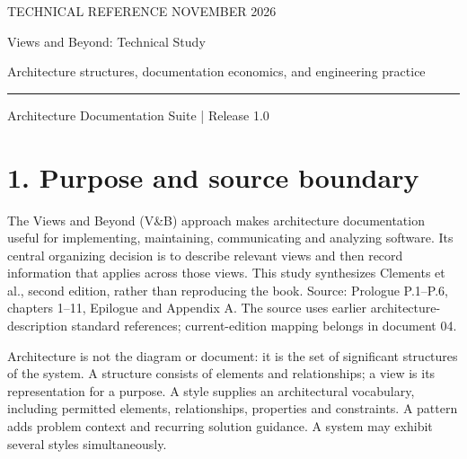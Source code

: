 \documentclass[11pt,letterpaper]{article}
\begin{document}
\thispagestyle{empty}
{\color{accent}\large TECHNICAL REFERENCE \hfill NOVEMBER 2026}\par\vspace{1.1cm}
{\color{ink}\LARGE\bfseries\raggedright Views and Beyond: Technical Study}\par\vspace{0.35cm}
{\Large Architecture structures, documentation economics, and engineering practice}\par\vspace{0.55cm}
\rule{\textwidth}{0.7pt}\par\smallskip
{\small Architecture Documentation Suite | Release 1.0}\par\vspace{0.7cm}
\tableofcontents
\newpage
\section*{1. Purpose and source boundary}
The Views and Beyond (V\&B) approach makes architecture documentation useful for implementing, maintaining, communicating and analyzing software. Its central organizing decision is to describe relevant views and then record information that applies across those views. This study synthesizes Clements et al., second edition, rather than reproducing the book. Source: Prologue P.1--P.6, chapters 1--11, Epilogue and Appendix A. The source uses earlier architecture-description standard references; current-edition mapping belongs in document 04.\par\smallskip
Architecture is not the diagram or document: it is the set of significant structures of the system. A structure consists of elements and relationships; a view is its representation for a purpose. A style supplies an architectural vocabulary, including permitted elements, relationships, properties and constraints. A pattern adds problem context and recurring solution guidance. A system may exhibit several styles simultaneously.\par\smallskip
\end{document}
